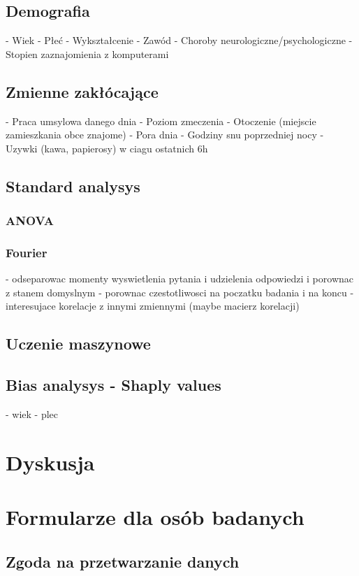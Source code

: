 \documentclass{./assets/wfis}
\begin{document}
\section{Demografia}
- Wiek
- Płeć
- Wykształcenie
- Zawód
- Choroby neurologiczne/psychologiczne
- Stopien zaznajomienia z komputerami
\section{Zmienne zakłócające}\label{zmiennne-zaklucajace}
- Praca umsylowa danego dnia
- Poziom zmeczenia
- Otoczenie (miejscie zamieszkania obce znajome)
- Pora dnia
- Godziny snu poprzedniej nocy
- Uzywki (kawa, papierosy) w ciagu ostatnich 6h
\section{Standard analysys}\label{analiza-klasyczna}
\subsection{ANOVA}
\subsection{Fourier}
- odseparowac momenty wyswietlenia pytania i udzielenia odpowiedzi i porownac z stanem domyslnym
- porownac czestotliwosci na poczatku badania i na koncu
- interesujace korelacje z innymi zmiennymi (maybe macierz korelacji)
\section{Uczenie maszynowe}\label{uczenie-maszynowe}
\section{Bias analysys - Shaply values}\label{bias}
- wiek
- plec

\chapter{Dyskusja}\label{dyskusja}

\appendix
\chapter{Formularze dla osób badanych}
\section{Zgoda na przetwarzanie danych}
\end{document}
